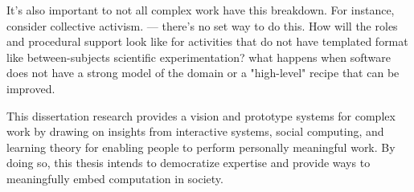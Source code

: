 It's also important to not all complex work have this breakdown. For instance, consider collective activism. — there’s no set way to do this. How will the roles and procedural support look like for activities that do not have templated format like between-subjects scientific experimentation?  what happens when software does not have a strong model of the domain or a "high-level" recipe that can be improved.


This dissertation research provides a vision and prototype systems for complex work by drawing on insights from interactive systems, social computing, and learning theory  for enabling people to perform personally meaningful work. By doing so, this thesis intends to democratize expertise and provide ways to meaningfully embed computation in society. 
